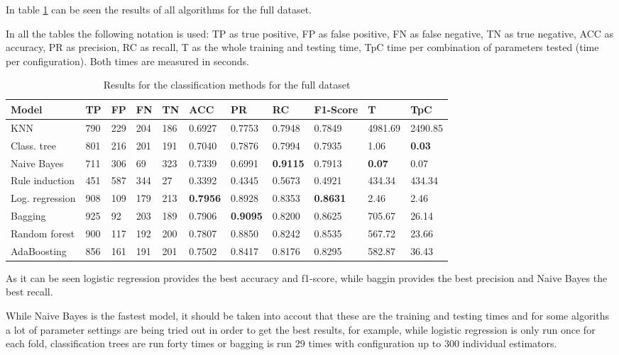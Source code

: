 \documentclass[a4paper,11pt]{article}
\begin{document}
In table \ref{class:full} can be seen the results of all algorithms for the full dataset.

In all the tables the following notation is used: TP as true positive, FP as false positive, FN as false negative, TN as true negative, ACC as accuracy, PR as precision, RC as recall, T as the whole training and testing time, TpC time per combination of parameters tested (time per configuration). Both times are measured in seconds.

\begin{table}
\centering

\begin{tabular}{|l|l|l|l|l|l|l|l|l|l|l|}
\hline

\textbf{Model} & \textbf{TP} & \textbf{FP} & \textbf{FN} & \textbf{TN} & \textbf{ACC} & \textbf{PR} & \textbf{RC} & \textbf{F1-Score} & \textbf{T} & \textbf{TpC} \\ \hline
KNN & 790 & 229 & 204 & 186 & 0.6927 & 0.7753 & 0.7948 & 0.7849 & 4981.69 & 2490.85 \\ \hline
Class. tree & 801 & 216 & 201 & 191 & 0.7040 & 0.7876 & 0.7994 & 0.7935 & 1.06 & \textbf{0.03} \\ \hline
Naive Bayes & 711 & 306 & 69 & 323 & 0.7339 & 0.6991 & \textbf{0.9115} & 0.7913 & \textbf{0.07} & 0.07 \\ \hline
Rule induction & 451 & 587 & 344 & 27 & 0.3392 & 0.4345 & 0.5673 & 0.4921 & 434.34 & 434.34 \\ \hline
Log. regression & 908 & 109 & 179 & 213 & \textbf{0.7956} & 0.8928 & 0.8353 & \textbf{0.8631} & 2.46 & 2.46 \\ \hline
Bagging & 925 & 92 & 203 & 189 & 0.7906 & \textbf{0.9095} & 0.8200 & 0.8625 & 705.67 & 26.14 \\ \hline
Random forest & 900 & 117 & 192 & 200 & 0.7807 & 0.8850 & 0.8242 & 0.8535 & 567.72 & 23.66 \\ \hline
AdaBoosting & 856 & 161 & 191 & 201 & 0.7502 & 0.8417 & 0.8176 & 0.8295 & 582.87 & 36.43 \\ \hline

\end{tabular}
\caption{Results for the classification methods for the full dataset}
\label{class:full}
\end{table}

As it can be seen logistic regression provides the best accuracy and f1-score, while baggin provides the best precision and Naive Bayes the best recall. 

While Naive Bayes is the fastest model, it should be taken into accout that these are the training and testing times and for some algoriths a lot of parameter settings are being tried out in order to get the best results, for example, while logistic regression is only run once for each fold, classification trees are run forty times or bagging is run 29 times with configuration up to 300 individual estimators.
\end{document}
